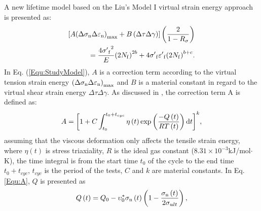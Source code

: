 \documentclass[preprint,5p,twocolumn,11pt,sort&compress]{elsarticle}
\begin{document}

A new lifetime model based on the Liu's Model I virtual strain energy approach is presented as:
\begin{equation}
\begin{aligned}
\left[ {A{{\left( {\Delta {\sigma _{\rm n}}\Delta {\varepsilon _{\rm n}}} \right)}_{\max }} + B\left( {\Delta \tau \Delta \gamma } \right)} \right]\left( {\frac{2}{{1 - {R_\sigma }}}} \right)\\
= \frac{{4{{\sigma '}_{\rm f}}^2}}{E}{\left( {2{N_{\rm f}}} \right)^{2b}} + 4{{\sigma '}_{\rm f}}{{\varepsilon '}_{\rm f}}{\left( {2{N_{\rm f}}} \right)^{b + c}}.
\end{aligned}
\label{Equ:StudyModel}
\end{equation}
In Eq. (\ref{Equ:StudyModel}), $A$ is a correction term according to the virtual tension strain energy ${{\left( {\Delta {\sigma _{\rm n}}\Delta {\varepsilon _{\rm n}}} \right)}_{\max }}$ and $B$ is a material constant in regard to the virtual shear strain energy ${\Delta \tau \Delta \gamma }$.
As discussed in \cite{Vose2013}, the correction term A is defined as:
\begin{equation}
A = {\left[ {1 + C\int_{{t_0}}^{{t_0} + {t_{cyc}}} {\eta \left( t \right)\exp \left( {\frac{{ - Q\left( t \right)}}{{RT\left( t \right)}}} \right){\rm{d}}t} } \right]^k},
\label{Equ:A}
\end{equation}
assuming that the viscous deformation only affects the tensile strain energy, where $\eta \left( t \right)$ is stress triaxiality, $R$ is the ideal gas constant ($8.31\times10^{-3}$kJ/mol$\cdot$K), the time integral is from the start time $t_0$ of the cycle to the end time $t_0 + t_{cyc}$, $t_{cyc}$ is the period of the tests, $C$ and $k$ are material constants.
In Eq. \ref{Equ:A}, $Q$ is presented \cite{Warren2006,Warren2008} as
\begin{equation}
Q\left( t \right) = {Q_0} - \upsilon _0^*{\sigma _{\rm n}}\left( t \right)\left( {1 - \frac{{{\sigma _{\rm n}}\left( t \right)}}{{2{\sigma _{ult}}}}} \right),
\label{Equ:creep_activation_energy}
\end{equation}
\end{document}
